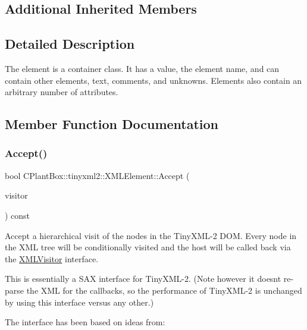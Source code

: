 \subsection*{Additional Inherited Members}


\subsection{Detailed Description}
The element is a container class. It has a value, the element name, and can contain other elements, text, comments, and unknowns. Elements also contain an arbitrary number of attributes. 

\subsection{Member Function Documentation}
\mbox{\label{classCPlantBox_1_1tinyxml2_1_1XMLElement_a1dd18a30230bb93e53c2676bd9edb1ae}} 
\subsubsection{\texorpdfstring{Accept()}{Accept()}}
{\footnotesize\ttfamily bool C\+Plant\+Box\+::tinyxml2\+::\+X\+M\+L\+Element\+::\+Accept (\begin{DoxyParamCaption}\item[{\hyperlink{classCPlantBox_1_1tinyxml2_1_1XMLVisitor}{X\+M\+L\+Visitor} $\ast$}]{visitor }\end{DoxyParamCaption}) const\hspace{0.3cm}{\ttfamily [virtual]}}

Accept a hierarchical visit of the nodes in the Tiny\+X\+M\+L-\/2 D\+OM. Every node in the X\+ML tree will be conditionally visited and the host will be called back via the \hyperlink{classCPlantBox_1_1tinyxml2_1_1XMLVisitor}{X\+M\+L\+Visitor} interface.

This is essentially a S\+AX interface for Tiny\+X\+M\+L-\/2. (Note however it doesn\textquotesingle{}t re-\/parse the X\+ML for the callbacks, so the performance of Tiny\+X\+M\+L-\/2 is unchanged by using this interface versus any other.)

The interface has been based on ideas from\+:


